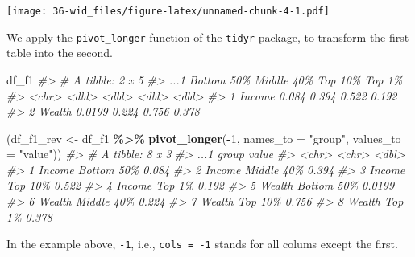 \documentclass[
  xelatex, ja=standard]{bxjsbook}
\newenvironment{Shaded}{\begin{snugshade}}{\end{snugshade}}
\newcommand{\AttributeTok}[1]{\textcolor[rgb]{0.13,0.29,0.53}{#1}}
\newcommand{\CommentTok}[1]{\textcolor[rgb]{0.56,0.35,0.01}{\textit{#1}}}
\newcommand{\DecValTok}[1]{\textcolor[rgb]{0.00,0.00,0.81}{#1}}
\newcommand{\FunctionTok}[1]{\textcolor[rgb]{0.13,0.29,0.53}{\textbf{#1}}}
\newcommand{\NormalTok}[1]{#1}
\newcommand{\OtherTok}[1]{\textcolor[rgb]{0.56,0.35,0.01}{#1}}
\newcommand{\SpecialCharTok}[1]{\textcolor[rgb]{0.81,0.36,0.00}{\textbf{#1}}}
\newcommand{\StringTok}[1]{\textcolor[rgb]{0.31,0.60,0.02}{#1}}
\theoremstyle{definition}
\theoremstyle{definition}
\theoremstyle{definition}
\theoremstyle{definition}
\theoremstyle{remark}
\begin{document}
\texttt{[image: 36-wid\_files/figure-latex/unnamed-chunk-4-1.pdf]}

We apply the \texttt{pivot\_longer} function of the \texttt{tidyr} package, to transform the first table into the second.

\begin{Shaded}
\begin{Highlighting}[]
\NormalTok{df\_f1}
\CommentTok{\#\textgreater{} \# A tibble: 2 x 5}
\CommentTok{\#\textgreater{}   ...1   \textasciigrave{}Bottom 50\%\textasciigrave{} \textasciigrave{}Middle 40\%\textasciigrave{} \textasciigrave{}Top 10\%\textasciigrave{} \textasciigrave{}Top 1\%\textasciigrave{}}
\CommentTok{\#\textgreater{}   \textless{}chr\textgreater{}         \textless{}dbl\textgreater{}        \textless{}dbl\textgreater{}     \textless{}dbl\textgreater{}    \textless{}dbl\textgreater{}}
\CommentTok{\#\textgreater{} 1 Income       0.084         0.394     0.522    0.192}
\CommentTok{\#\textgreater{} 2 Wealth       0.0199        0.224     0.756    0.378}
\end{Highlighting}
\end{Shaded}

\begin{Shaded}
\begin{Highlighting}[]
\NormalTok{(df\_f1\_rev }\OtherTok{\textless{}{-}}\NormalTok{ df\_f1 }\SpecialCharTok{\%\textgreater{}\%} \FunctionTok{pivot\_longer}\NormalTok{(}\SpecialCharTok{{-}}\DecValTok{1}\NormalTok{, }\AttributeTok{names\_to =} \StringTok{"group"}\NormalTok{, }\AttributeTok{values\_to =} \StringTok{"value"}\NormalTok{))}
\CommentTok{\#\textgreater{} \# A tibble: 8 x 3}
\CommentTok{\#\textgreater{}   ...1   group       value}
\CommentTok{\#\textgreater{}   \textless{}chr\textgreater{}  \textless{}chr\textgreater{}       \textless{}dbl\textgreater{}}
\CommentTok{\#\textgreater{} 1 Income Bottom 50\% 0.084 }
\CommentTok{\#\textgreater{} 2 Income Middle 40\% 0.394 }
\CommentTok{\#\textgreater{} 3 Income Top 10\%    0.522 }
\CommentTok{\#\textgreater{} 4 Income Top 1\%     0.192 }
\CommentTok{\#\textgreater{} 5 Wealth Bottom 50\% 0.0199}
\CommentTok{\#\textgreater{} 6 Wealth Middle 40\% 0.224 }
\CommentTok{\#\textgreater{} 7 Wealth Top 10\%    0.756 }
\CommentTok{\#\textgreater{} 8 Wealth Top 1\%     0.378}
\end{Highlighting}
\end{Shaded}

In the example above, \texttt{-1}, i.e., \texttt{cols\ =\ -1} stands for all colums except the first.
\end{document}

